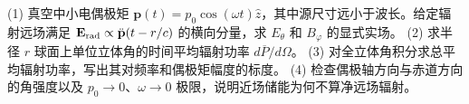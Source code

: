 (1) 真空中小电偶极矩 \(\mathbf p(t)=p_0\cos(\omega t)\hat z\)，其中源尺寸远小于波长。给定辐射远场满足 \(\mathbf E_{\rm rad}\propto\ddot{\mathbf p}(t-r/c)\) 的横向分量，求 \(E_\theta\) 和 \(B_\varphi\) 的显式实场。
(2) 求半径 \(r\) 球面上单位立体角的时间平均辐射功率 \(d\overline P/d\Omega\)。
(3) 对全立体角积分求总平均辐射功率，写出其对频率和偶极矩幅度的标度。
(4) 检查偶极轴方向与赤道方向的角强度以及 \(p_0\to0\)、\(\omega\to0\) 极限，说明近场储能为何不算净远场辐射。
